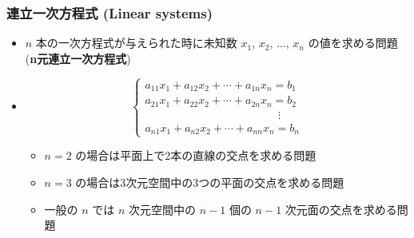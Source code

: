 \documentclass[dvipdfmx,aspectratio=169,20pt]{beamer}
\newcommand{\myfontsetting}[3]{{\fontsize{#1}{#2}\selectfont #3}}
\begin{document}
\date[\todey]{}

\frame{\titlepage}

\begin{frame}
\frametitle{連立一次方程式 {\small (Linear systems)}}

\begin{itemize}
    \item \myfontsetting{16pt}{16pt}{$n$ 本の一次方程式が与えられた時に未知数 $x_1$, $x_2$, $\dots$, $x_n$ の値を求める問題} \myfontsetting{12pt}{12pt}{({\bf n元連立一次方程式})}
    \item[] \myfontsetting{14pt}{14pt}{
\[
\begin{cases}
a_{11}x_1 + a_{12}x_2 + \cdots + a_{1n}x_n = b_1\\
a_{21}x_1 + a_{22}x_2 + \cdots + a_{2n}x_n = b_2\\
\hspace{5cm}\vdots\\
a_{n1}x_1 + a_{n2}x_2 + \cdots + a_{nn}x_n = b_n
\end{cases}
\]
}

\vspace{-2mm}

    \begin{itemize}
        \item \myfontsetting{10pt}{10pt}{$n=2$ の場合は平面上で2本の直線の交点を求める問題}
\vspace{-2mm}
        \item \myfontsetting{10pt}{10pt}{$n=3$ の場合は3次元空間中の3つの平面の交点を求める問題}
\vspace{-2mm}
        \item \myfontsetting{10pt}{10pt}{一般の $n$ では $n$ 次元空間中の $n-1$ 個の $n-1$ 次元面の交点を求める問題}
    \end{itemize}
\end{itemize}
\end{frame}
\end{document}
